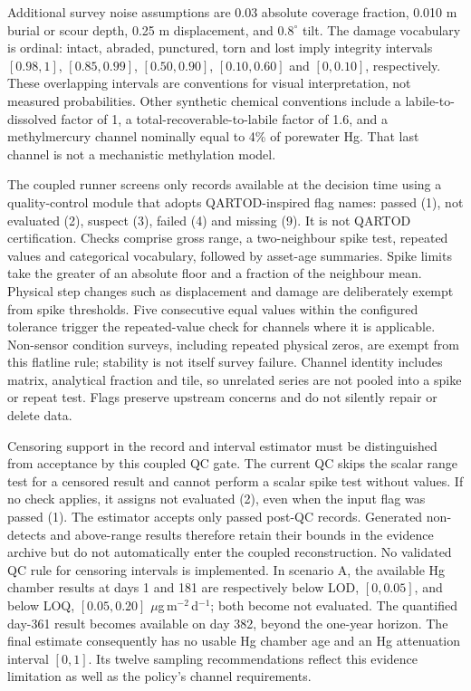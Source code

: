 Additional survey noise assumptions are 0.03 absolute coverage fraction, 0.010 m burial or scour depth, 0.25 m displacement, and $0.8^\circ$ tilt. The damage vocabulary is ordinal: intact, abraded, punctured, torn and lost imply integrity intervals $[0.98,1]$, $[0.85,0.99]$, $[0.50,0.90]$, $[0.10,0.60]$ and $[0,0.10]$, respectively. These overlapping intervals are conventions for visual interpretation, not measured probabilities. Other synthetic chemical conventions include a labile-to-dissolved factor of 1, a total-recoverable-to-labile factor of 1.6, and a methylmercury channel nominally equal to 4\% of porewater Hg. That last channel is not a mechanistic methylation model.

The coupled runner screens only records available at the decision time using a quality-control module that adopts QARTOD-inspired flag names: passed (1), not evaluated (2), suspect (3), failed (4) and missing (9). It is not QARTOD certification.\cite{qartod} Checks comprise gross range, a two-neighbour spike test, repeated values and categorical vocabulary, followed by asset-age summaries. Spike limits take the greater of an absolute floor and a fraction of the neighbour mean. Physical step changes such as displacement and damage are deliberately exempt from spike thresholds. Five consecutive equal values within the configured tolerance trigger the repeated-value check for channels where it is applicable. Non-sensor condition surveys, including repeated physical zeros, are exempt from this flatline rule; stability is not itself survey failure. Channel identity includes matrix, analytical fraction and tile, so unrelated series are not pooled into a spike or repeat test. Flags preserve upstream concerns and do not silently repair or delete data.

Censoring support in the record and interval estimator must be distinguished from acceptance by this coupled QC gate. The current QC skips the scalar range test for a censored result and cannot perform a scalar spike test without values. If no check applies, it assigns not evaluated (2), even when the input flag was passed (1). The estimator accepts only passed post-QC records. Generated non-detects and above-range results therefore retain their bounds in the evidence archive but do not automatically enter the coupled reconstruction. No validated QC rule for censoring intervals is implemented. In scenario A, the available Hg chamber results at days 1 and 181 are respectively below LOD, $[0,0.05]$, and below LOQ, $[0.05,0.20]$ $\mu$g\,m$^{-2}$\,d$^{-1}$; both become not evaluated. The quantified day-361 result becomes available on day 382, beyond the one-year horizon. The final estimate consequently has no usable Hg chamber age and an Hg attenuation interval $[0,1]$. Its twelve sampling recommendations reflect this evidence limitation as well as the policy's channel requirements.

